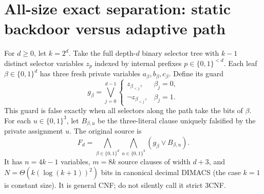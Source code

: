 \documentclass[11pt]{article}
\begin{document}
\section*{All-size exact separation: static backdoor versus adaptive path}
For \(d\ge0\), let \(k=2^d\). Take the full depth-\(d\) binary selector tree with \(k-1\) distinct selector variables \(z_p\) indexed by internal prefixes \(p\in\{0,1\}^{<d}\). Each leaf \(\beta\in\{0,1\}^d\) has three fresh private variables \(a_\beta,b_\beta,c_\beta\). Define its guard
\[
g_\beta=\bigvee_{j=0}^{d-1}
\begin{cases}
z_{\beta_{<j}},&\beta_j=0,\\
\neg z_{\beta_{<j}},&\beta_j=1.
\end{cases}
\]
This guard is false exactly when all selectors along the path take the bits of \(\beta\). For each \(u\in\{0,1\}^3\), let \(B_{\beta,u}\) be the three-literal clause uniquely falsified by the private assignment \(u\). The original source is
\[
F_d=\bigwedge_{\beta\in\{0,1\}^d}\bigwedge_{u\in\{0,1\}^3}(g_\beta\vee B_{\beta,u}).
\]
It has \(n=4k-1\) variables, \(m=8k\) source clauses of width \(d+3\), and \(N=\Theta(k(\log(k+1))^2)\) bits in canonical decimal DIMACS (the case \(k=1\) is constant size). It is general CNF; do not silently call it strict 3CNF.
\end{document}
